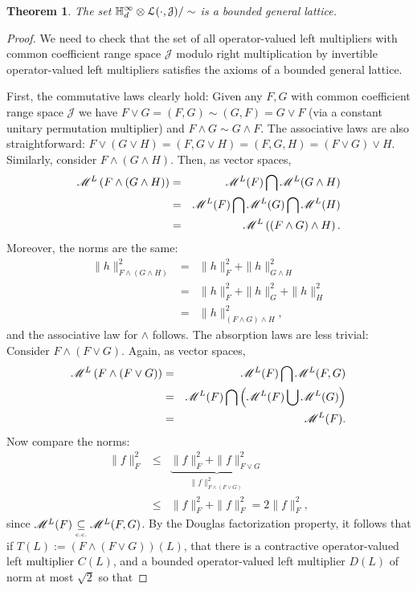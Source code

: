 \documentclass[11pt]{article}
\newcommand{\ba}{\begin{eqnarray}}
\newcommand{\ea}{\end{eqnarray}}
\newcommand{\nn}{\nonumber}
\newcommand{\scr}{\ensuremath{\mathscr}}
\newcommand{\mc}{\ensuremath{\mathcal}}
\def\bH{\mathbb{H}}
\def\cJ{\mathcal{J}}
\def\cc{\underset{\mbox{\tiny \mbox{\tiny c.c.}}}{\subseteq}}
\numberwithin{equation}{section}
\numberwithin{subsection}{section}
\newtheorem{thm}[subsection]{Theorem}
\theoremstyle{definition}
\begin{document}
\begin{thm}
The set $ \displaystyle \bH ^\infty _d \otimes \mc{L} ( \cdot, \cJ ) / \sim$ is a bounded general lattice.
\end{thm}
\begin{proof}
We need to check that the set of all operator-valued left multipliers with common coefficient range space $\cJ$ modulo right multiplication by invertible operator-valued left multipliers satisfies the axioms of a bounded general lattice.

First, the commutative laws clearly hold: Given any $F, G$ with common coefficient range space $\cJ$ we have $F \vee G = (F , G) \sim (G,F) = G \vee F$ (via a constant unitary permutation multiplier) and $F \wedge G \sim G \wedge F$. The associative laws are also straightforward: $F \vee (G \vee H) = (F, G\vee H) = (F, G, H) = (F \vee G) \vee H$. Similarly, consider $F \wedge (G \wedge H)$. Then, as vector spaces,
\ba \scr{M} ^L \left( F \wedge (G \wedge H) \right) & = & \scr{M} ^L (F) \bigcap \scr{M} ^L (G \wedge H) \nn \\
& = & \scr{M} ^L (F) \bigcap \scr{M} ^L (G) \bigcap \scr{M} ^L (H) \nn \\
& = & \scr{M} ^L \left( (F \wedge G) \wedge H \right). \nn \ea
Moreover, the norms are the same:
\ba \| h \| ^2 _{F \wedge (G \wedge H )} & = & \| h \| ^2 _F + \| h \| ^2 _{G \wedge H} \nn \\
& = & \| h \| ^2 _F + \| h \| ^2 _G + \| h \| ^2 _H \nn \\
& = & \| h \| ^2 _{(F\wedge G) \wedge H}, \nn \ea
and the associative law for $\wedge$ follows. The absorption laws are less trivial: Consider $F \wedge (F \vee G)$. Again, as vector spaces,
\ba \scr{M} ^L \left( F \wedge (F \vee G) \right) & = & \scr{M} ^L (F) \bigcap \scr{M} ^L (F, G) \nn \\
& = & \scr{M} ^L (F) \bigcap \left( \scr{M} ^L (F) \bigcup \scr{M} ^L (G) \right) \nn \\
& = & \scr{M} ^L (F). \nn \ea 
Now compare the norms: 
\ba \| f \| ^2 _{F} & \leq & \underbrace{\| f \| ^2 _{F} + \| f \| ^2 _{F \vee G} }_{ \| f \| ^2 _{F \wedge (F \vee G)}} \nn \\
& \leq & \| f \| ^2 _{F} + \| f \| ^2 _F = 2 \| f \| ^2 _F, \nn \ea since $\scr{M} ^L (F) \cc \scr{M} ^L (F,G)$. By the Douglas factorization property, it follows that if $T(L) := \left( F \wedge (F \vee G) \right) (L)$, that there is a contractive operator-valued left multiplier $C(L)$, and a bounded operator-valued left multiplier $D(L)$ of norm at most $\sqrt{2}$ so that 

\end{proof}
\end{document}
